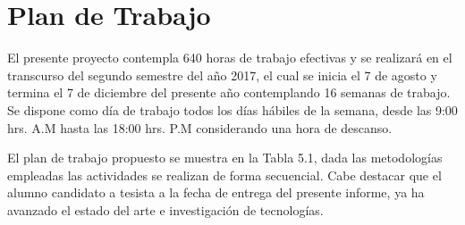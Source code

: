 \chapter{Plan de Trabajo}
\label{chp:plan-trabajo}

El presente proyecto contempla 640 horas de trabajo efectivas y se realizará en el transcurso del segundo semestre del año 2017, el cual se inicia el 7 de agosto y termina el 7 de diciembre del presente año contemplando 16 semanas de trabajo. Se dispone como día de trabajo todos los días hábiles de la semana, desde las 9:00 hrs. A.M hasta las 18:00 hrs. P.M considerando una hora de descanso. 

El plan de trabajo propuesto se muestra en la Tabla 5.1, dada las metodologías empleadas las actividades se realizan de forma secuencial. Cabe destacar que el alumno candidato a tesista a la fecha de entrega del presente informe, ya ha avanzado el estado del arte e investigación de tecnologías.